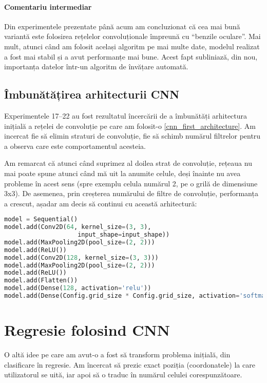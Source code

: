 \paragraph{Comentariu intermediar}
Din experimentele prezentate până acum am concluzionat că cea mai bună variantă este folosirea rețelelor convoluționale împreună cu ``benzile oculare''.
Mai mult, atunci când am folosit același algoritm pe mai multe date, modelul realizat a fost mai stabil și a avut performanțe mai bune.
Acest fapt subliniază, din nou, importanța datelor într-un algoritm de învățare automată.

\subsection{Îmbunătățirea arhitecturii CNN}
Experimentele 17–22 au fost rezultatul încercării de a îmbunătăți arhitectura inițială a rețelei de convoluție pe care am folosit-o \ref{cnn_first_architecture}.
Am incercat fie să elimin straturi de convoluție, fie să schimb numărul filtrelor pentru a observa care este comportamentul acesteia.

Am remarcat că atunci când suprimez al doilea strat de convoluție, rețeaua nu mai poate spune atunci când mă uit la anumite celule, deși înainte nu avea probleme în acest sens (spre exemplu celula numărul 2, pe o grilă de dimensiune 3x3).
De asemenea, prin creșterea numărului de filtre de convoluție, performanța a crescut, așadar am decis să continui cu această arhitectură:

\begin{lstlisting}[language=Python, caption=Arhitectura CNN îmbunătățită]
model = Sequential()
model.add(Conv2D(64, kernel_size=(3, 3),
                    input_shape=input_shape))
model.add(MaxPooling2D(pool_size=(2, 2)))
model.add(ReLU())
model.add(Conv2D(128, kernel_size=(3, 3)))
model.add(MaxPooling2D(pool_size=(2, 2)))
model.add(ReLU())
model.add(Flatten())
model.add(Dense(128, activation='relu'))
model.add(Dense(Config.grid_size * Config.grid_size, activation='softmax'))
\end{lstlisting}

\section{Regresie folosind CNN}
O altă idee pe care am avut-o a fost să transform problema inițială, din clasificare în regresie.
Am încercat să prezic exact poziția (coordonatele) la care utilizatorul se uită, iar apoi să o traduc în numărul celulei corespunzătoare.

